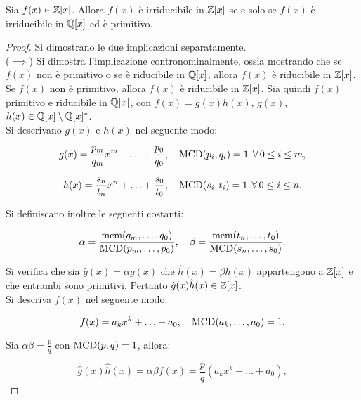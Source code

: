 \documentclass[11pt]{scrbook}
\begin{document}
\begin{theorem}
    \label{th:lemma_gauss_2}
    Sia $f(x) \in \mathbb{Z}[x]$. Allora $f(x)$ è irriducibile in $\mathbb{Z}[x]$
    se e solo se $f(x)$ è irriducibile in $\mathbb{Q}[x]$ ed è primitivo.
\end{theorem}

\begin{proof} Si dimostrano le due implicazioni separatamente. \\

    ($\implies$)\; Si dimostra l'implicazione contronominalmente,
    ossia mostrando che se $f(x)$ non è primitivo o se è
    riducibile in $\mathbb{Q}[x]$, allora $f(x)$ è riducibile in $\mathbb{Z}[x]$. \\

    Se $f(x)$ non è primitivo, allora
    $f(x)$ è riducibile in $\mathbb{Z}[x]$. Sia quindi $f(x)$ primitivo
    e riducibile in $\mathbb{Q}[x]$, con $f(x)=g(x)h(x)$,
    $g(x)$, $h(x) \in \mathbb{Q}[x] \setminus \mathbb{Q}[x]^*$. \\

    Si descrivano $g(x)$ e $h(x)$ nel seguente modo:

    \[ g(x)=\frac{p_m}{q_m} x^m + \ldots + \frac{p_0}{q_0}, \quad \MCD(p_i, q_i)=1 \; \forall 0 \leq i \leq m, \]

    \[ h(x)=\frac{s_n}{t_n} x^n + \ldots + \frac{s_0}{t_0}, \quad
        \MCD(s_i, t_i)=1 \; \forall 0 \leq i \leq n. \]

    \vskip 0.1in

    Si definiscano inoltre le seguenti costanti:

    \[ \alpha = \frac{\operatorname{mcm}(q_m, \ldots, q_0)}{\operatorname{MCD}(p_m, \ldots, p_0)}, \quad \beta = \frac{\operatorname{mcm}(t_n, \ldots, t_0)}{\operatorname{MCD}(s_n, \ldots, s_0)}. \]

    \vskip 0.1in

    Si verifica che sia $\hat{g}(x)=\alpha g(x)$ che
    $\hat{h}(x)=\beta h(x)$ appartengono a $\mathbb{Z}[x]$ e che entrambi
    sono primitivi. Pertanto $\hat{g}(x) \hat{h}(x) \in \mathbb{Z}[x]$. \\

    Si descriva $f(x)$ nel seguente modo:

    \[ f(x)=a_k x^k + \ldots + a_0, \quad \operatorname{MCD}(a_k,\ldots,a_0)=1. \]

    \vskip 0.1in

    Sia $\alpha \beta = \frac{p}{q}$ con $\operatorname{MCD}(p,q)=1$, allora:

    \[\hat{g}(x) \hat{h}(x) = \alpha \beta f(x) = \frac{p}{q} (a_k x^k + \ldots + a_0), \]


\end{proof}
\end{document}
